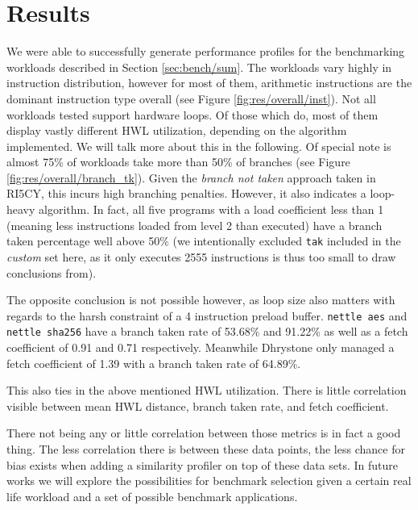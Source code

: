 \documentclass[../bachelor_paper.tex]{subfiles}
\begin{document}
\chapter{Results}
    \label{ch:res}
    
We were able to successfully generate performance profiles for the benchmarking workloads described in Section \ref{sec:bench/sum}. The workloads vary highly in instruction distribution, however for most of them, arithmetic instructions are the dominant instruction type overall (see Figure \ref{fig:res/overall/inst}). Not all workloads tested support hardware loops. Of those which do, most of them display vastly different \ac{HWL} utilization, depending on the algorithm implemented. We will talk more about this in the following. Of special note is almost 75\% of workloads take more than 50\% of branches (see Figure \ref{fig:res/overall/branch_tk}). Given the \emph{branch not taken} approach taken in RI5CY, this incurs high branching penalties. However, it also indicates a loop-heavy algorithm. In fact, all five programs with a load coefficient less than 1 (meaning less instructions loaded from level 2 than executed) have a branch taken percentage well above 50\% (we intentionally excluded \texttt{tak} included in the \emph{custom} set here, as it only executes 2555 instructions is thus too small to draw conclusions from). 

The opposite conclusion is not possible however, as loop size also matters with regards to the harsh constraint of a 4 instruction preload buffer. \texttt{nettle aes} and \texttt{nettle sha256} have a branch taken rate of 53.68\% and 91.22\% as well as a fetch coefficient of 0.91 and 0.71 respectively. Meanwhile Dhrystone only managed a fetch coefficient of 1.39 with a branch taken rate of 64.89\%. 

This also ties in the above mentioned \ac{HWL} utilization. There is little correlation visible between mean \ac{HWL} distance, branch taken rate, and fetch coefficient.

There not being any or little correlation between those metrics is in fact a good thing. The less correlation there is between these data points, the less chance for bias exists when adding a similarity profiler on top of these data sets. In future works we will explore the possibilities for benchmark selection given a certain real life workload and a set of possible benchmark applications.
\end{document}
